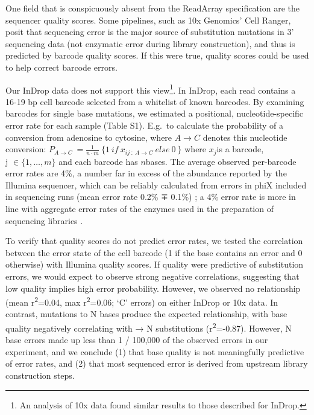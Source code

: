 
One field that is conspicuously absent from the ReadArray specification are the sequencer quality scores.  
Some pipelines, such as 10x Genomics' Cell Ranger, posit that sequencing error is the major source of substitution mutations in 3' sequencing data (not enzymatic error during library construction), and thus is predicted by barcode quality scores. 
If this were true, quality scores could be used to help correct barcode errors. 

Our InDrop data does not support this view\footnote{An analysis of 10x data found similar results to those described for InDrop.}. 
In InDrop, each read contains a 16-19 bp cell barcode selected from a whitelist of known barcodes. 
By examining barcodes for single base mutations, we estimated a positional, nucleotide-specific error rate for each sample (Table S1). E.g.\ to calculate the probability of a conversion from adenosine to cytosine, where \(A \rightarrow C\) denotes this nucleotide conversion: \(P_{A \rightarrow C}\  = \frac{1}{n \cdot m}\ \{ 1\ if\ x_{ij\ :\ A \rightarrow C}\ else\ 0\ \}\) where \(x_{j}\)is a barcode, \(\text{j\ } \in \{ 1,\ldots,m\}\) and each barcode has \(n\)bases. 
The average observed per-barcode error rates are 4\%, a number far in excess of the abundance reported by the Illumina sequencer, which can be reliably calculated from errors in phiX included in sequencing runs (mean error rate 0.2\% ∓ 0.1\%) \citep{Manley2016}; a 4\% error rate is more in line with aggregate error rates of the enzymes used in the preparation of sequencing libraries \citep{Zilionis2017}.

To verify that quality scores do not predict error rates, we tested the correlation between the error state of the cell barcode (1 if the base contains an error and 0 otherwise) with Illumina quality scores. 
If quality were predictive of substitution errors, we would expect to observe strong negative correlations, suggesting that low quality implies high error probability. 
However, we observed no relationship (mean r\textsuperscript{2}=0.04, max r\textsuperscript{2}=0.06; `C' errors) on either InDrop or 10x data.
In contrast, mutations to N bases produce the expected relationship, with base quality negatively correlating with → N substitutions (r\textsuperscript{2}=-0.87). However, N base errors made up less than 1 / 100,000 of the observed errors in our experiment, and we conclude (1) that base quality is not meaningfully predictive of error rates, and (2) that most sequenced error is derived from upstream library construction steps.

